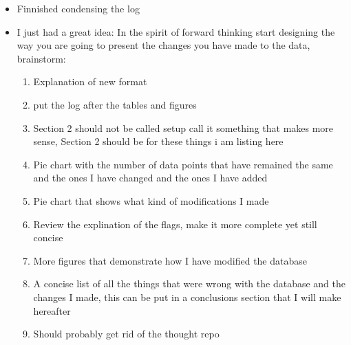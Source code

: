 \documentclass[12pt]{article}
\begin{document}
\begin{itemize}
    \item Finnished condensing the log
    \item I just had a great idea: In the spirit of forward thinking start designing the way you are going to present the changes you have made to the data, brainstorm:
    \begin{enumerate}
        \item Explanation of new format
        \item put the log after the tables and figures
        \item Section 2 should not be called setup call it something that makes more sense, Section 2 should be for these things i am listing here
        \item Pie chart with the number of data points that have remained the same and the ones I have changed and the ones I have added
        \item Pie chart that shows what kind of modifications I made
        \item Review the explination of the flags, make it more complete yet still concise
        \item More figures that demonstrate how I have modified the database
        \item A concise list of all the things that were wrong with the database and the changes I made, this can be put in a conclusions section that I will make hereafter
        \item Should probably get rid of the thought repo
    \end{enumerate}
\end{itemize}
\end{document}
